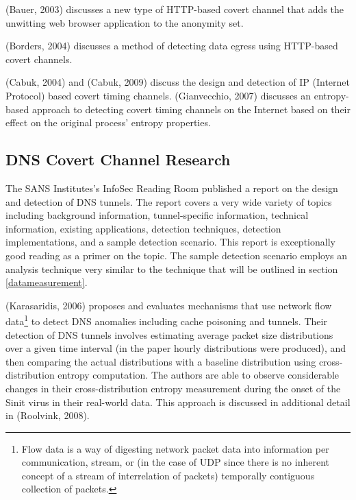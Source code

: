 \documentclass[12pt]{article}
\theoremstyle{remark}
\theoremstyle{definition}
\theoremstyle{definition}
\theoremstyle{definition}
\begin{document}
(Bauer, 2003)\cite{Bauer2003} discusses a new type of HTTP-based covert channel
that adds the unwitting web browser application to the anonymity set.

(Borders, 2004)\cite{Borders2004} discusses a method of detecting data egress
using HTTP-based covert channels.

(Cabuk, 2004)\cite{Cabuk2004} and (Cabuk, 2009)\cite{Cabuk2009} discuss the
design and detection of IP (Internet Protocol) based covert timing channels.
(Gianvecchio, 2007)\cite{Gianvecchio2007} discusses an entropy-based approach to
detecting covert timing channels on the Internet based on their effect on the
original process' entropy properties.

\subsection{DNS Covert Channel Research}
The SANS Institutes's InfoSec Reading Room published a report on the design and
detection of DNS tunnels\cite{SANS2013}. The report covers a very wide variety
of topics including background information, tunnel-specific information,
technical information, existing applications, detection techniques, detection
implementations, and a sample detection scenario. This report is exceptionally
good reading as a primer on the topic. The sample detection scenario employs an
analysis technique very similar to the technique that will be outlined in
section \ref{datameasurement}.

(Karasaridis, 2006)\cite{Karasaridis2006} proposes and evaluates mechanisms that
use network flow data\footnote{Flow data is a way of digesting network packet
data into information per communication, stream, or (in the case of UDP since
there is no inherent concept of a stream of interrelation of packets) temporally
contiguous collection of packets.} to detect DNS anomalies including cache
poisoning and tunnels. Their detection of DNS tunnels involves estimating
average packet size distributions over a given time interval (in the paper
hourly distributions were produced), and then comparing the actual distributions
with a baseline distribution using cross-distribution entropy computation. The
authors are able to observe considerable changes in their cross-distribution
entropy measurement during the onset of the Sinit virus in their real-world
data. This approach is discussed in additional detail in (Roolvink,
2008)\cite{Roolvink2008}.
\end{document}
